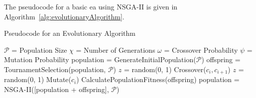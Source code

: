 The pseudocode for a basic \gls{ea} using NSGA-II is given in
Algorithm~\ref{alg:evolutionaryAlgorithm}.

\begin{algorithm}
    \caption{Pseudocode for an Evolutionary Algorithm}%
    \label{alg:evolutionaryAlgorithm}
    \begin{algorithmic}
        \State \( \mathcal{P} \) = Population Size
        \State \( \chi \) = Number of Generations
        \State \( \omega \) = Crossover Probability
        \State \( \psi \) = Mutation Probability
        \State
        \State population = GenerateInitialPopulation(\( \mathcal{P} \))
        \State offspring = TournamentSelection(population, \( \mathcal{P} \))
        \State \(z\) = random(0, 1)
        \State Crossover(\( c_i, c_{i+1} \))
        \EndIf
        \EndFor
        \State \(z\) = random(0, 1)
        \State Mutate(\( c_i \))
        \EndIf
        \EndFor
        \State CalculatePopulationFitness(offspring)
        \State population = NSGA-II([population + offspring], \(\mathcal{P}\))
        \EndFor
    \end{algorithmic}
\end{algorithm}
